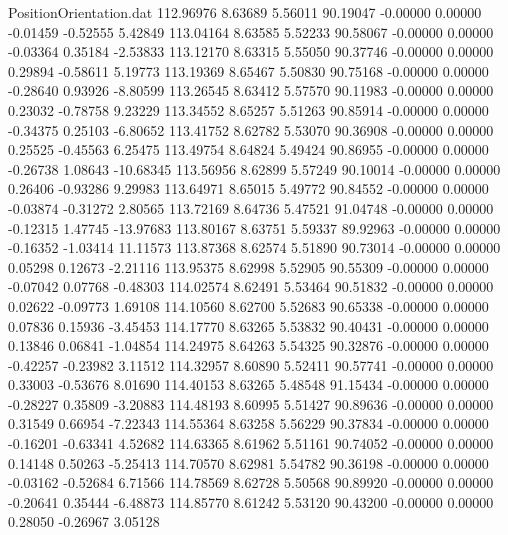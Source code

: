 \begin{filecontents}{PositionOrientation.dat}
 112.96976    8.63689    5.56011    90.19047   -0.00000    0.00000   -0.01459   -0.52555    5.42849
 113.04164    8.63585    5.52233    90.58067   -0.00000    0.00000   -0.03364    0.35184   -2.53833
 113.12170    8.63315    5.55050    90.37746   -0.00000    0.00000    0.29894   -0.58611    5.19773
 113.19369    8.65467    5.50830    90.75168   -0.00000    0.00000   -0.28640    0.93926   -8.80599
 113.26545    8.63412    5.57570    90.11983   -0.00000    0.00000    0.23032   -0.78758    9.23229
 113.34552    8.65257    5.51263    90.85914   -0.00000    0.00000   -0.34375    0.25103   -6.80652
 113.41752    8.62782    5.53070    90.36908   -0.00000    0.00000    0.25525   -0.45563    6.25475
 113.49754    8.64824    5.49424    90.86955   -0.00000    0.00000   -0.26738    1.08643  -10.68345
 113.56956    8.62899    5.57249    90.10014   -0.00000    0.00000    0.26406   -0.93286    9.29983
 113.64971    8.65015    5.49772    90.84552   -0.00000    0.00000   -0.03874   -0.31272    2.80565
 113.72169    8.64736    5.47521    91.04748   -0.00000    0.00000   -0.12315    1.47745  -13.97683
 113.80167    8.63751    5.59337    89.92963   -0.00000    0.00000   -0.16352   -1.03414   11.11573
 113.87368    8.62574    5.51890    90.73014   -0.00000    0.00000    0.05298    0.12673   -2.21116
 113.95375    8.62998    5.52905    90.55309   -0.00000    0.00000   -0.07042    0.07768   -0.48303
 114.02574    8.62491    5.53464    90.51832   -0.00000    0.00000    0.02622   -0.09773    1.69108
 114.10560    8.62700    5.52683    90.65338   -0.00000    0.00000    0.07836    0.15936   -3.45453
 114.17770    8.63265    5.53832    90.40431   -0.00000    0.00000    0.13846    0.06841   -1.04854
 114.24975    8.64263    5.54325    90.32876   -0.00000    0.00000   -0.42257   -0.23982    3.11512
 114.32957    8.60890    5.52411    90.57741   -0.00000    0.00000    0.33003   -0.53676    8.01690
 114.40153    8.63265    5.48548    91.15434   -0.00000    0.00000   -0.28227    0.35809   -3.20883
 114.48193    8.60995    5.51427    90.89636   -0.00000    0.00000    0.31549    0.66954   -7.22343
 114.55364    8.63258    5.56229    90.37834   -0.00000    0.00000   -0.16201   -0.63341    4.52682
 114.63365    8.61962    5.51161    90.74052   -0.00000    0.00000    0.14148    0.50263   -5.25413
 114.70570    8.62981    5.54782    90.36198   -0.00000    0.00000   -0.03162   -0.52684    6.71566
 114.78569    8.62728    5.50568    90.89920   -0.00000    0.00000   -0.20641    0.35444   -6.48873
 114.85770    8.61242    5.53120    90.43200   -0.00000    0.00000    0.28050   -0.26967    3.05128

\end{filecontents}

